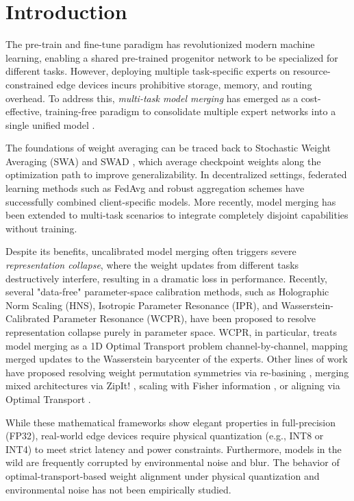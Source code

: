 \documentclass{article}
\theoremstyle{plain}
\theoremstyle{definition}
\theoremstyle{remark}
\begin{document}
\section{Introduction}
The pre-train and fine-tune paradigm has revolutionized modern machine learning, enabling a shared pre-trained progenitor network to be specialized for different tasks. However, deploying multiple task-specific experts on resource-constrained edge devices incurs prohibitive storage, memory, and routing overhead. To address this, \emph{multi-task model merging} has emerged as a cost-effective, training-free paradigm to consolidate multiple expert networks into a single unified model \cite{ilharco2023editing, wortsman2022robust, wortsman2022model, choshen2022fusing, ortiz2023task}. 

The foundations of weight averaging can be traced back to Stochastic Weight Averaging (SWA) \cite{swa2018} and SWAD \cite{swad2021}, which average checkpoint weights along the optimization path to improve generalizability. In decentralized settings, federated learning methods such as FedAvg \cite{fedavg2017} and robust aggregation schemes \cite{gupta2020federated} have successfully combined client-specific models. More recently, model merging has been extended to multi-task scenarios to integrate completely disjoint capabilities without training.

Despite its benefits, uncalibrated model merging often triggers severe \emph{representation collapse}, where the weight updates from different tasks destructively interfere, resulting in a dramatic loss in performance. Recently, several "data-free" parameter-space calibration methods, such as Holographic Norm Scaling (HNS), Isotropic Parameter Resonance (IPR), and Wasserstein-Calibrated Parameter Resonance (WCPR), have been proposed to resolve representation collapse purely in parameter space. WCPR, in particular, treats model merging as a 1D Optimal Transport problem channel-by-channel, mapping merged updates to the Wasserstein barycenter of the experts. Other lines of work have proposed resolving weight permutation symmetries via re-basining \cite{ainsworth2023git}, merging mixed architectures via ZipIt! \cite{stoica2023zipit}, scaling with Fisher information \cite{matena2022merging}, or aligning via Optimal Transport \cite{NEURIPS2020_Singh, jin2022dataless}.

While these mathematical frameworks show elegant properties in full-precision (FP32), real-world edge devices require physical quantization (e.g., INT8 or INT4) to meet strict latency and power constraints. Furthermore, models in the wild are frequently corrupted by environmental noise and blur. The behavior of optimal-transport-based weight alignment under physical quantization and environmental noise has not been empirically studied.
\end{document}
